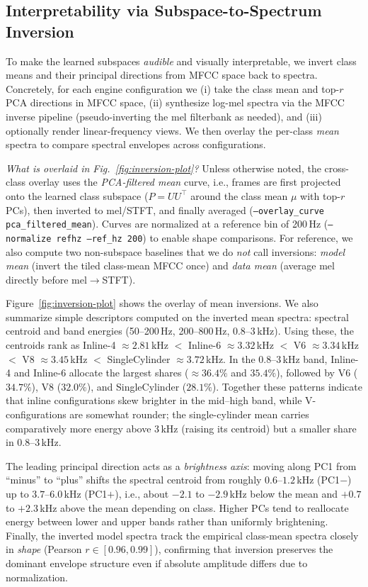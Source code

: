 \documentclass[11pt]{article}
\begin{document}
\subsection{Interpretability via Subspace-to-Spectrum Inversion}
\FloatBarrier
To make the learned subspaces \emph{audible} and visually interpretable, we invert class means and their principal directions from MFCC space back to spectra. Concretely, for each engine configuration we (i) take the class mean and top-$r$ PCA directions in MFCC space, (ii) synthesize log-mel spectra via the MFCC inverse pipeline (pseudo-inverting the mel filterbank as needed), and (iii) optionally render linear-frequency views. We then overlay the per-class \emph{mean} spectra to compare spectral envelopes across configurations.

\textit{What is overlaid in Fig.~\ref{fig:inversion-plot}?}  
Unless otherwise noted, the cross-class overlay uses the \emph{PCA-filtered mean} curve, i.e., frames are first projected onto the learned class subspace ($P = UU^\top$ around the class mean $\mu$ with top-$r$ PCs), then inverted to mel/STFT, and finally averaged (\texttt{--overlay\_curve pca\_filtered\_mean}). Curves are normalized at a reference bin of 200\,Hz (\texttt{--normalize refhz --ref\_hz 200}) to enable shape comparisons. For reference, we also compute two non-subspace baselines that we do \emph{not} call inversions: \emph{model mean} (invert the tiled class-mean MFCC once) and \emph{data mean} (average mel directly before mel$\rightarrow$STFT).

Figure~\ref{fig:inversion-plot} shows the overlay of mean inversions. We also summarize simple descriptors computed on the inverted mean spectra: spectral centroid and band energies (50--200\,Hz, 200--800\,Hz, 0.8--3\,kHz). Using these, the centroids rank as
Inline-4 $\approx 2.81$\,kHz
$<$ Inline-6 $\approx 3.32$\,kHz
$<$ V6 $\approx 3.34$\,kHz
$<$ V8 $\approx 3.45$\,kHz
$<$ Single\text{-}Cylinder $\approx 3.72$\,kHz.
In the 0.8--3\,kHz band, Inline-4 and Inline-6 allocate the largest shares ($\approx 36.4\%$ and $35.4\%$), followed by V6 ($34.7\%$), V8 ($32.0\%$), and Single\text{-}Cylinder ($28.1\%$). Together these patterns indicate that inline configurations skew brighter in the mid--high band, while V-configurations are somewhat rounder; the single-cylinder mean carries comparatively more energy above 3\,kHz (raising its centroid) but a smaller share in 0.8--3\,kHz.

The leading principal direction acts as a \emph{brightness axis}: moving along PC1 from ``minus'' to ``plus'' shifts the spectral centroid from roughly $0.6$--$1.2$\,kHz (PC1$-$) up to $3.7$--$6.0$\,kHz (PC1$+$), i.e., about $-2.1$ to $-2.9$\,kHz below the mean and $+0.7$ to $+2.3$\,kHz above the mean depending on class. Higher PCs tend to reallocate energy between lower and upper bands rather than uniformly brightening. Finally, the inverted model spectra track the empirical class-mean spectra closely in \emph{shape} (Pearson $r \in [0.96, 0.99]$), confirming that inversion preserves the dominant envelope structure even if absolute amplitude differs due to normalization.
\end{document}
